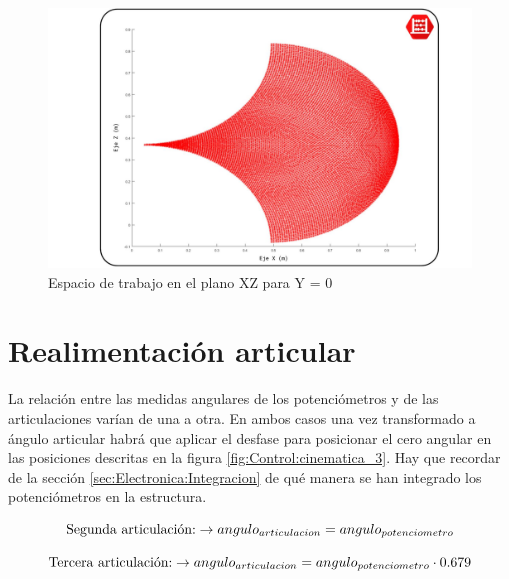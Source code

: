 	 \begin{figure}[H]
	 	\centering
	 	\includegraphics[width=\textwidth]{figuras/Imagenes_cinematica/workspace_robot.jpg}
	 	\caption{Espacio de trabajo en el plano XZ para Y = 0}
	 	\label{fig:cinematica:espacioTrabajo}
	 \end{figure}
\section{Realimentación articular}

	La relación entre las medidas angulares de los potenciómetros y de las articulaciones varían de una a otra. En ambos casos una vez transformado a ángulo articular habrá que aplicar el desfase para posicionar el cero angular en las posiciones descritas en la figura \ref{fig:Control:cinematica_3}. Hay que recordar de la sección \ref{sec:Electronica:Integracion} de qué manera se han integrado los potenciómetros en la estructura.
	
	   \begin{equation}
		   \textnormal{Segunda articulación:} \to	angulo_{articulacion} = angulo_{potenciometro} 
	   \end{equation}
	   
	   \begin{equation}
		   \textnormal{Tercera articulación:} \to	   angulo_{articulacion} = angulo_{potenciometro} \cdot 0.679
	   \end{equation}
